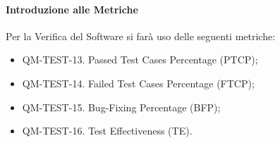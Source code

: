 		\paragraph{Introduzione alle Metriche}

			Per la Verifica del Software si farà uso delle seguenti metriche:

			\begin{itemize}

				\item QM-TEST-13. Passed Test Cases Percentage (PTCP);
				\item QM-TEST-14. Failed Test Cases Percentage (FTCP);
				\item QM-TEST-15. Bug-Fixing Percentage (BFP);
				\item QM-TEST-16. Test Effectiveness (TE).
			\end{itemize}







